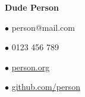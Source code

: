 
\begin{center}
    {\Huge \bfseries Dude Person}\\
\end{center}
\par
\hspace{7.5cm}$\bullet$ person@mail.com\par
\hspace{7.5cm}$\bullet$ 0123 456 789\par
\hspace{7.5cm}$\bullet$ \href{https://person.org}{person.org}\par
\hspace{7.5cm}$\bullet$ \href{https://github.com/person}{github.com/person}
